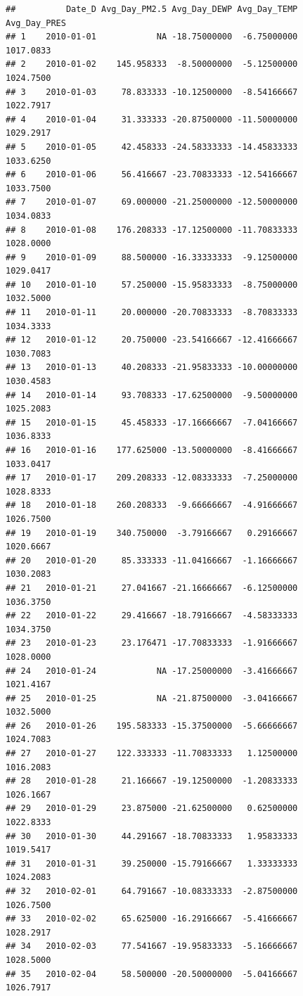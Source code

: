 \documentclass[
]{article}
\begin{document}
\begin{verbatim}
##          Date_D Avg_Day_PM2.5 Avg_Day_DEWP Avg_Day_TEMP Avg_Day_PRES
## 1    2010-01-01            NA -18.75000000  -6.75000000    1017.0833
## 2    2010-01-02    145.958333  -8.50000000  -5.12500000    1024.7500
## 3    2010-01-03     78.833333 -10.12500000  -8.54166667    1022.7917
## 4    2010-01-04     31.333333 -20.87500000 -11.50000000    1029.2917
## 5    2010-01-05     42.458333 -24.58333333 -14.45833333    1033.6250
## 6    2010-01-06     56.416667 -23.70833333 -12.54166667    1033.7500
## 7    2010-01-07     69.000000 -21.25000000 -12.50000000    1034.0833
## 8    2010-01-08    176.208333 -17.12500000 -11.70833333    1028.0000
## 9    2010-01-09     88.500000 -16.33333333  -9.12500000    1029.0417
## 10   2010-01-10     57.250000 -15.95833333  -8.75000000    1032.5000
## 11   2010-01-11     20.000000 -20.70833333  -8.70833333    1034.3333
## 12   2010-01-12     20.750000 -23.54166667 -12.41666667    1030.7083
## 13   2010-01-13     40.208333 -21.95833333 -10.00000000    1030.4583
## 14   2010-01-14     93.708333 -17.62500000  -9.50000000    1025.2083
## 15   2010-01-15     45.458333 -17.16666667  -7.04166667    1036.8333
## 16   2010-01-16    177.625000 -13.50000000  -8.41666667    1033.0417
## 17   2010-01-17    209.208333 -12.08333333  -7.25000000    1028.8333
## 18   2010-01-18    260.208333  -9.66666667  -4.91666667    1026.7500
## 19   2010-01-19    340.750000  -3.79166667   0.29166667    1020.6667
## 20   2010-01-20     85.333333 -11.04166667  -1.16666667    1030.2083
## 21   2010-01-21     27.041667 -21.16666667  -6.12500000    1036.3750
## 22   2010-01-22     29.416667 -18.79166667  -4.58333333    1034.3750
## 23   2010-01-23     23.176471 -17.70833333  -1.91666667    1028.0000
## 24   2010-01-24            NA -17.25000000  -3.41666667    1021.4167
## 25   2010-01-25            NA -21.87500000  -3.04166667    1032.5000
## 26   2010-01-26    195.583333 -15.37500000  -5.66666667    1024.7083
## 27   2010-01-27    122.333333 -11.70833333   1.12500000    1016.2083
## 28   2010-01-28     21.166667 -19.12500000  -1.20833333    1026.1667
## 29   2010-01-29     23.875000 -21.62500000   0.62500000    1022.8333
## 30   2010-01-30     44.291667 -18.70833333   1.95833333    1019.5417
## 31   2010-01-31     39.250000 -15.79166667   1.33333333    1024.2083
## 32   2010-02-01     64.791667 -10.08333333  -2.87500000    1026.7500
## 33   2010-02-02     65.625000 -16.29166667  -5.41666667    1028.2917
## 34   2010-02-03     77.541667 -19.95833333  -5.16666667    1028.5000
## 35   2010-02-04     58.500000 -20.50000000  -5.04166667    1026.7917

\end{verbatim}
\end{document}

